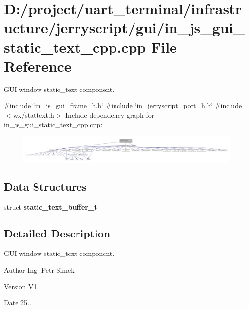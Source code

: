 \section{D\+:/project/uart\+\_\+terminal/infrastructure/jerryscript/gui/in\+\_\+js\+\_\+gui\+\_\+static\+\_\+text\+\_\+cpp.cpp File Reference}
\label{in__js__gui__static__text__cpp_8cpp}


G\+UI window static\+\_\+text component.  


{\ttfamily \#include \char`\"{}in\+\_\+js\+\_\+gui\+\_\+frame\+\_\+h.\+h\char`\"{}}\newline
{\ttfamily \#include \char`\"{}in\+\_\+jerryscript\+\_\+port\+\_\+h.\+h\char`\"{}}\newline
{\ttfamily \#include $<$wx/stattext.\+h$>$}\newline
Include dependency graph for in\+\_\+js\+\_\+gui\+\_\+static\+\_\+text\+\_\+cpp.\+cpp\+:
\nopagebreak
\begin{figure}[H]
\begin{center}
\leavevmode
\includegraphics[width=350pt]{in__js__gui__static__text__cpp_8cpp__incl}
\end{center}
\end{figure}
\subsection*{Data Structures}
\begin{DoxyCompactItemize}
\item 
struct \textbf{ static\+\_\+text\+\_\+buffer\+\_\+t}
\end{DoxyCompactItemize}


\subsection{Detailed Description}
G\+UI window static\+\_\+text component. 

\begin{DoxyAuthor}{Author}
Ing. Petr Simek 
\end{DoxyAuthor}
\begin{DoxyVersion}{Version}
V1. 
\end{DoxyVersion}
\begin{DoxyDate}{Date}
25.. 
\end{DoxyDate}
